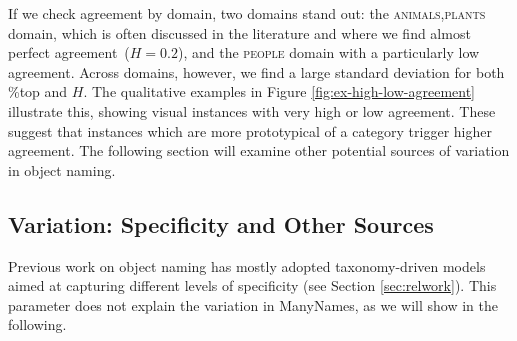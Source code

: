 If we check agreement by domain, two domains stand out: the \textsc{animals,plants} domain, which is often discussed in the literature and where we find almost perfect agreement\ (\mbox{$H=0.2$}), and the \textsc{people} domain with a particularly low agreement.
Across domains, however, we find a large standard deviation for both \%top and $H$.
The qualitative examples in Figure \ref{fig:ex-high-low-agreement} %
illustrate this, showing visual instances with very high or low agreement. 
These suggest that instances which are more prototypical of a category trigger higher agreement.
The following section will examine other potential sources of variation in object naming.


\subsection{Variation: Specificity and Other Sources}
\label{ssec:variation}
Previous work on object naming has mostly adopted taxonomy-driven models aimed at capturing different levels of specificity (see Section \ref{sec:relwork}).
This parameter does not explain the variation in ManyNames, as we will show in the following. 

